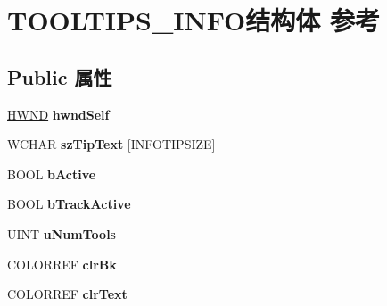 \hypertarget{struct_t_o_o_l_t_i_p_s___i_n_f_o}{}\section{T\+O\+O\+L\+T\+I\+P\+S\+\_\+\+I\+N\+F\+O结构体 参考}
\label{struct_t_o_o_l_t_i_p_s___i_n_f_o}
\subsection*{Public 属性}
\begin{DoxyCompactItemize}
\item 
\mbox{\label{struct_t_o_o_l_t_i_p_s___i_n_f_o_a9af43e57d87251fe60e8db7ac7103449}} 
\hyperlink{interfacevoid}{H\+W\+ND} {\bfseries hwnd\+Self}
\item 
\mbox{\label{struct_t_o_o_l_t_i_p_s___i_n_f_o_aef99a413409ffdb0870fa98ba12ae506}} 
W\+C\+H\+AR {\bfseries sz\+Tip\+Text} \mbox{[}I\+N\+F\+O\+T\+I\+P\+S\+I\+ZE\mbox{]}
\item 
\mbox{\label{struct_t_o_o_l_t_i_p_s___i_n_f_o_a33a5cfe3b5acdbf7f22b29df0d620193}} 
B\+O\+OL {\bfseries b\+Active}
\item 
\mbox{\label{struct_t_o_o_l_t_i_p_s___i_n_f_o_ae41d4e10dea878629e9dde2644523e10}} 
B\+O\+OL {\bfseries b\+Track\+Active}
\item 
\mbox{\label{struct_t_o_o_l_t_i_p_s___i_n_f_o_a4ae3cbca132b23bf1e81691d19e65cc6}} 
U\+I\+NT {\bfseries u\+Num\+Tools}
\item 
\mbox{\label{struct_t_o_o_l_t_i_p_s___i_n_f_o_a27c91a97dd13c252af5dfda61c57d6c4}} 
C\+O\+L\+O\+R\+R\+EF {\bfseries clr\+Bk}
\item 
\mbox{\label{struct_t_o_o_l_t_i_p_s___i_n_f_o_aa6bc52db3c8aa224ac0598bc81cb1197}} 
C\+O\+L\+O\+R\+R\+EF {\bfseries clr\+Text}
\item 
\mbox{\label{struct_t_o_o_l_t_i_p_s___i_n_f_o_a6281ef896a3ec510aae78b68b2b9c457}} 

\end{DoxyCompactItemize}
